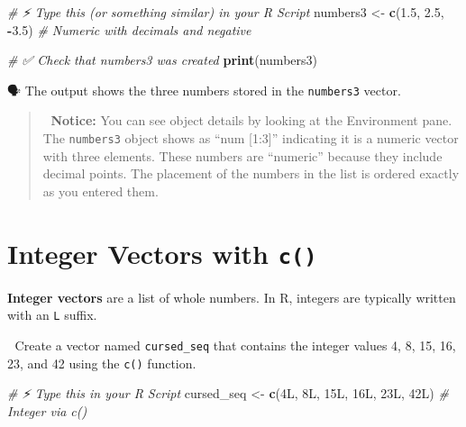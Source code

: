 \documentclass[
  12pt,
]{scrreprt}
\newenvironment{Shaded}{\begin{snugshade}}{\end{snugshade}}
\newcommand{\CommentTok}[1]{\textcolor[rgb]{0.56,0.35,0.01}{\textit{#1}}}
\newcommand{\DataTypeTok}[1]{\textcolor[rgb]{0.13,0.29,0.53}{#1}}
\newcommand{\DecValTok}[1]{\textcolor[rgb]{0.00,0.00,0.81}{#1}}
\newcommand{\FloatTok}[1]{\textcolor[rgb]{0.00,0.00,0.81}{#1}}
\newcommand{\FunctionTok}[1]{\textcolor[rgb]{0.13,0.29,0.53}{\textbf{#1}}}
\newcommand{\NormalTok}[1]{#1}
\newcommand{\OtherTok}[1]{\textcolor[rgb]{0.56,0.35,0.01}{#1}}
\newcommand{\SpecialCharTok}[1]{\textcolor[rgb]{0.81,0.36,0.00}{\textbf{#1}}}
\begin{document}
\begin{Shaded}
\begin{Highlighting}[]
\CommentTok{\# ⚡ Type this (or something similar) in your R Script}
\NormalTok{numbers3  }\OtherTok{\textless{}{-}} \FunctionTok{c}\NormalTok{(}\FloatTok{1.5}\NormalTok{, }\FloatTok{2.5}\NormalTok{, }\SpecialCharTok{{-}}\FloatTok{3.5}\NormalTok{)                }\CommentTok{\# Numeric with decimals and negative}
\end{Highlighting}
\end{Shaded}

\begin{Shaded}
\begin{Highlighting}[]
\CommentTok{\# ✅ Check that numbers3 was created }
\FunctionTok{print}\NormalTok{(numbers3)}
\end{Highlighting}
\end{Shaded}

🗣 The output shows the three numbers stored in the \texttt{numbers3}
vector.

\begin{quote}
🧐 \textbf{Notice:} You can see object details by looking at the
Environment pane. The \texttt{numbers3} object shows as ``num
{[}1:3{]}'' indicating it is a numeric vector with three elements. These
numbers are ``numeric'' because they include decimal points. The
placement of the numbers in the list is ordered exactly as you entered
them.
\end{quote}

\section{\texorpdfstring{Integer Vectors with
\texttt{c()}}{Integer Vectors with c()}}\label{integer-vectors-with-c}

\textbf{Integer vectors} are a list of whole numbers. In R, integers are
typically written with an \texttt{L} suffix.

🎯 Create a vector named \texttt{cursed\_seq} that contains the integer
values 4, 8, 15, 16, 23, and 42 using the \texttt{c()} function.

\begin{Shaded}
\begin{Highlighting}[]
\CommentTok{\# ⚡ Type this in your R Script}
\NormalTok{cursed\_seq }\OtherTok{\textless{}{-}} \FunctionTok{c}\NormalTok{(}\DecValTok{4}\DataTypeTok{L}\NormalTok{, }\DecValTok{8}\DataTypeTok{L}\NormalTok{, }\DecValTok{15}\DataTypeTok{L}\NormalTok{, }\DecValTok{16}\DataTypeTok{L}\NormalTok{, }\DecValTok{23}\DataTypeTok{L}\NormalTok{, }\DecValTok{42}\DataTypeTok{L}\NormalTok{)          }\CommentTok{\# Integer via c()}
\end{Highlighting}
\end{Shaded}
\end{document}
